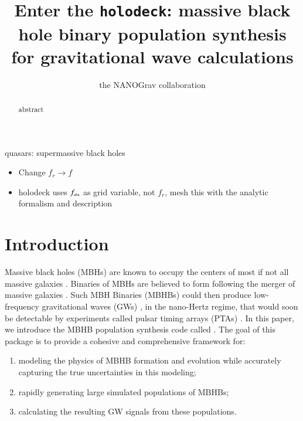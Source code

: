 \documentclass[useAMS, usenatbib]{mnras}
\title[holodeck: MBH binary populations]{Enter the \texttt{holodeck}: massive black hole binary population synthesis for gravitational wave calculations}
\author[NANOGrav]{the NANOGrav collaboration}
\begin{document}
\maketitle

\begin{abstract}
    abstract
\end{abstract}

\begin{keywords}
    quasars: supermassive black holes
\end{keywords}





\begin{itemize}
    \item Change $f_r \rightarrow f$
    \item holodeck uses $f_\trt{obs}$ as grid variable, not $f_r$, mesh this with the analytic formalism and description
\end{itemize}


\section{Introduction}
    \label{sec:intro}

    Massive black holes (MBHs) are known to occupy the centers of most if not all massive galaxies \needcite{}.
    Binaries of MBHs are believed to form following the merger of massive galaxies \needcite{}.  Such MBH Binaries (MBHBs) could then produce low-frequency gravitational waves (GWs) , in the nano-Hertz regime, that would soon be detectable by experiments called pulsar timing arrays (PTAs) .  In this paper, we introduce the MBHB population synthesis code called \holodeck{}.  The goal of this package is to provide a cohesive and comprehensive framework for:
    \begin{enumerate}
        \item
        modeling the physics of MBHB formation and evolution while accurately capturing the true uncertainties in this modeling;
        \item
        rapidly generating large simulated populations of MBHBs;
        \item
        calculating the resulting GW signals from these populations.
    \end{enumerate}
\end{document}
